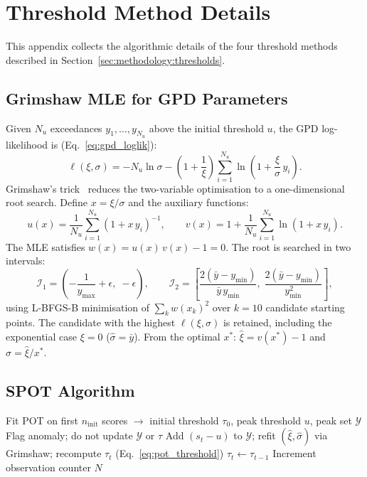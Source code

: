 \documentclass[11pt]{report}
\begin{document}
\chapter{Threshold Method Details}\label{app:thresholds}

This appendix collects the algorithmic details of the four threshold methods described in Section~\ref{sec:methodology:thresholds}.

\section{Grimshaw MLE for GPD Parameters}\label{app:thresholds:grimshaw}

Given $N_u$ exceedances $y_1, \ldots, y_{N_u}$ above the initial threshold $u$, the GPD log-likelihood is (Eq.~\ref{eq:gpd_loglik}):
\begin{equation*}
  \ell(\xi, \sigma) = -N_u \ln \sigma - \left(1 + \frac{1}{\xi}\right)\sum_{i=1}^{N_u} \ln\!\left(1 + \frac{\xi}{\sigma}\,y_i\right).
\end{equation*}
Grimshaw's trick~\cite{siffer:hal-01640325} reduces the two-variable optimisation to a one-dimensional root search. Define $x = \xi/\sigma$ and the auxiliary functions:
\begin{equation*}
  u(x) = \frac{1}{N_u}\sum_{i=1}^{N_u}(1 + x\,y_i)^{-1}, \qquad v(x) = 1 + \frac{1}{N_u}\sum_{i=1}^{N_u}\ln(1 + x\,y_i).
\end{equation*}
The MLE satisfies $w(x) = u(x)\,v(x) - 1 = 0$. The root is searched in two intervals:
\begin{equation*}
  \mathcal{I}_1 = \left(-\frac{1}{y_{\max}} + \epsilon,\; -\epsilon\right), \qquad
  \mathcal{I}_2 = \left[\frac{2(\bar{y} - y_{\min})}{\bar{y}\,y_{\min}},\; \frac{2(\bar{y} - y_{\min})}{y_{\min}^2}\right],
\end{equation*}
using L-BFGS-B minimisation of $\sum_k w(x_k)^2$ over $k = 10$ candidate starting points. The candidate with the highest $\ell(\xi, \sigma)$ is retained, including the exponential case $\xi = 0$ ($\hat{\sigma} = \bar{y}$). From the optimal $x^*$: $\hat{\xi} = v(x^*) - 1$ and $\hat{\sigma} = \hat{\xi}/x^*$.

\section{SPOT Algorithm}\label{app:thresholds:spot}

\begin{algorithmic}[1]
\State Fit POT on first $n_{\text{init}}$ scores $\to$ initial threshold $\tau_0$, peak threshold $u$, peak set $\mathcal{Y}$
    \State Flag anomaly; do not update $\mathcal{Y}$ or $\tau$
    \State Add $(s_t - u)$ to $\mathcal{Y}$; refit $(\hat{\xi}, \hat{\sigma})$ via Grimshaw; recompute $\tau_t$ (Eq.~\ref{eq:pot_threshold})
  \Else
    \State $\tau_t \gets \tau_{t-1}$
  \EndIf
  \State Increment observation counter $N$
\EndFor
\end{algorithmic}
\end{document}
